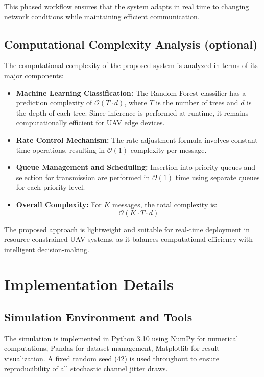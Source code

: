 \documentclass[pdflatex,sn-mathphys-num]{sn-jnl}%
\theoremstyle{thmstyleone}%
\theoremstyle{thmstyletwo}%
\theoremstyle{thmstylethree}%
\begin{document}
This phased workflow ensures that the system adapts in real time to changing network conditions while maintaining efficient communication.

\subsection{ Computational Complexity Analysis (optional) }

The computational complexity of the proposed system is analyzed in terms of its major components:

\begin{itemize}
    \item \textbf{Machine Learning Classification:} The Random Forest classifier has a prediction complexity of $\mathcal{O}(T \cdot d)$, where $T$ is the number of trees and $d$ is the depth of each tree. Since inference is performed at runtime, it remains computationally efficient for UAV edge devices.

    \item \textbf{Rate Control Mechanism:} The rate adjustment formula involves constant-time operations, resulting in $\mathcal{O}(1)$ complexity per message.

    \item \textbf{Queue Management and Scheduling:} Insertion into priority queues and selection for transmission are performed in $\mathcal{O}(1)$ time using separate queues for each priority level.

    \item \textbf{Overall Complexity:} For $K$ messages, the total complexity is:
    \[
    \mathcal{O}(K \cdot T \cdot d)
    \]
\end{itemize}

The proposed approach is lightweight and suitable for real-time deployment in resource-constrained UAV systems, as it balances computational efficiency with intelligent decision-making.

\section{ Implementation Details }
\subsection{ Simulation Environment and Tools }
The simulation is implemented in Python 3.10 using NumPy for numerical computations, Pandas for dataset management, Matplotlib for result visualization. A fixed random seed (42) is used throughout to ensure reproducibility of all stochastic channel jitter draws.
\end{document}
